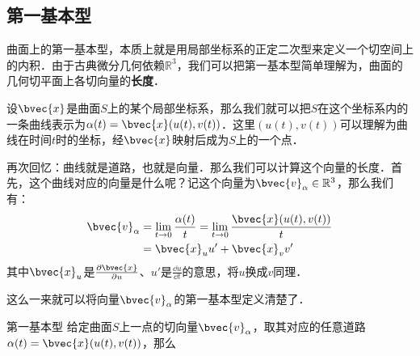 

\subsection{第一基本型}

曲面上的第一基本型，本质上就是用局部坐标系的正定二次型来定义一个切空间上的内积．由于古典微分几何依赖$\mathbb{R}^3$，我们可以把第一基本型简单理解为，曲面的几何切平面上各切向量的\textbf{长度}．

设$\bvec{x}$是曲面$S$上的某个局部坐标系，那么我们就可以把$S$在这个坐标系内的一条曲线表示为$\alpha(t)=\bvec{x}(u(t), v(t))$．这里$(u(t), v(t))$可以理解为曲线在时间$t$时的坐标，经$\bvec{x}$映射后成为$S$上的一个点．

再次回忆：曲线就是道路，也就是向量．那么我们可以计算这个向量的长度．首先，这个曲线对应的向量是什么呢？记这个向量为$\bvec{v}_\alpha\in\mathbb{R}^3$，那么我们有：
\begin{equation}
\begin{aligned}
\bvec{v}_\alpha&=\lim\limits_{t\to 0}\frac{\alpha(t)}{t}=\lim\limits_{t\to 0}\frac{\bvec{x}(u(t), v(t))}{t}\\
&=\bvec{x}_uu'+\bvec{x}_vv'
\end{aligned}
\end{equation}
其中$\bvec{x}_u$是$\frac{\partial\bvec{x}}{\partial u}$、$u'$是$\frac{\dd u}{\dd t}$的意思，将$u$换成$v$同理．

这么一来就可以将向量$\bvec{v}_\alpha$的第一基本型定义清楚了．

\begin{definition}{第一基本型}
给定曲面$S$上一点的切向量$\bvec{v}_\alpha$，取其对应的任意道路$\alpha(t)=\bvec{x}(u(t), v(t))$，那么
\end{definition}
